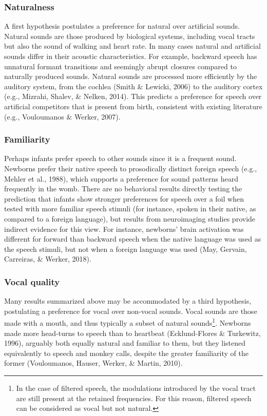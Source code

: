 \documentclass[man,floatsintext]{apa6}
\let\rmarkdownfootnote\footnote%
\def\footnote{\protect\rmarkdownfootnote}
\begin{document}
\hypertarget{naturalness}{%
\subsubsection{Naturalness}\label{naturalness}}

A first hypothesis postulates a preference for natural over artificial sounds. Natural sounds are those produced by biological systems, including vocal tracts but also the sound of walking and heart rate. In many cases natural and artificial sounds differ in their acoustic characteristics. For example, backward speech has unnatural formant transitions and seemingly abrupt closures compared to naturally produced sounds. Natural sounds are processed more efficiently by the auditory system, from the cochlea (Smith \& Lewicki, 2006) to the auditory cortex (e.g., Mizrahi, Shalev, \& Nelken, 2014). This predicts a preference for speech over artificial competitors that is present from birth, consistent with existing literature (e.g., Vouloumanos \& Werker, 2007).

\hypertarget{familiarity}{%
\subsubsection{Familiarity}\label{familiarity}}

Perhaps infants prefer speech to other sounds since it is a frequent sound. Newborns prefer their native speech to prosodically distinct foreign speech (e.g., Mehler et al., 1988), which supports a preference for sound patterns heard frequently in the womb. There are no behavioral results directly testing the prediction that infants show stronger preferences for speech over a foil when tested with more familiar speech stimuli (for instance, spoken in their native, as compared to a foreign language), but results from neuroimaging studies provide indirect evidence for this view. For instance, newborns' brain activation was different for forward than backward speech when the native language was used as the speech stimuli, but not when a foreign language was used (May, Gervain, Carreiras, \& Werker, 2018).

\hypertarget{vocal-quality}{%
\subsubsection{Vocal quality}\label{vocal-quality}}

Many results summarized above may be accommodated by a third hypothesis, postulating a preference for vocal over non-vocal sounds. Vocal sounds are those made with a mouth, and thus typically a subset of natural sounds\footnote{In the case of filtered speech, the modulations introduced by the vocal tract are still present at the retained frequencies. For this reason, filtered speech can be considered as vocal but not natural.}. Newborns made more head-turns to speech than to heartbeat (Ecklund-Flores \& Turkewitz, 1996), arguably both equally natural and familiar to them, but they listened equivalently to speech and monkey calls, despite the greater familiarity of the former (Vouloumanos, Hauser, Werker, \& Martin, 2010).
\end{document}
